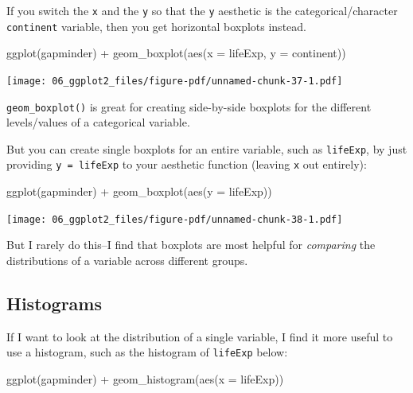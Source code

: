 \documentclass[
  letterpaper,
  DIV=11,
  numbers=noendperiod]{scrreprt}
\newenvironment{Shaded}{\begin{snugshade}}{\end{snugshade}}
\newcommand{\AttributeTok}[1]{\textcolor[rgb]{0.40,0.45,0.13}{#1}}
\newcommand{\FunctionTok}[1]{\textcolor[rgb]{0.28,0.35,0.67}{#1}}
\newcommand{\NormalTok}[1]{\textcolor[rgb]{0.00,0.23,0.31}{#1}}
\newcommand{\SpecialCharTok}[1]{\textcolor[rgb]{0.37,0.37,0.37}{#1}}
\begin{document}
If you switch the \texttt{x} and the \texttt{y} so that the \texttt{y}
aesthetic is the categorical/character \texttt{continent} variable, then
you get horizontal boxplots instead.

\begin{Shaded}
\begin{Highlighting}[]
\FunctionTok{ggplot}\NormalTok{(gapminder) }\SpecialCharTok{+} 
  \FunctionTok{geom\_boxplot}\NormalTok{(}\FunctionTok{aes}\NormalTok{(}\AttributeTok{x =}\NormalTok{ lifeExp, }\AttributeTok{y =}\NormalTok{ continent))}
\end{Highlighting}
\end{Shaded}

\texttt{[image: 06\_ggplot2\_files/figure-pdf/unnamed-chunk-37-1.pdf]}

\texttt{geom\_boxplot()} is great for creating side-by-side boxplots for
the different levels/values of a categorical variable.

But you can create single boxplots for an entire variable, such as
\texttt{lifeExp}, by just providing \texttt{y\ =\ lifeExp} to your
aesthetic function (leaving \texttt{x} out entirely):

\begin{Shaded}
\begin{Highlighting}[]
\FunctionTok{ggplot}\NormalTok{(gapminder) }\SpecialCharTok{+} 
  \FunctionTok{geom\_boxplot}\NormalTok{(}\FunctionTok{aes}\NormalTok{(}\AttributeTok{y =}\NormalTok{ lifeExp))}
\end{Highlighting}
\end{Shaded}

\texttt{[image: 06\_ggplot2\_files/figure-pdf/unnamed-chunk-38-1.pdf]}

But I rarely do this--I find that boxplots are most helpful for
\emph{comparing} the distributions of a variable across different
groups.

\subsection{Histograms}\label{histograms}

If I want to look at the distribution of a single variable, I find it
more useful to use a histogram, such as the histogram of
\texttt{lifeExp} below:

\begin{Shaded}
\begin{Highlighting}[]
\FunctionTok{ggplot}\NormalTok{(gapminder) }\SpecialCharTok{+} 
  \FunctionTok{geom\_histogram}\NormalTok{(}\FunctionTok{aes}\NormalTok{(}\AttributeTok{x =}\NormalTok{ lifeExp))}
\end{Highlighting}
\end{Shaded}
\end{document}
